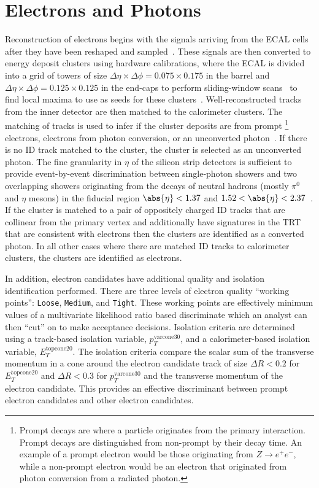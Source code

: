 \section{Electrons and Photons}\label{section:e_gamma}

Reconstruction of electrons begins with the signals arriving from the ECAL cells after they have been reshaped and sampled~\cite{PERF-2013-05}.
These signals are then converted to energy deposit clusters using hardware calibrations, where the ECAL is divided into a grid of towers of size $\Delta \eta \times \Delta \phi = 0.075 \times 0.175$ in the barrel and $\Delta \eta \times \Delta \phi = 0.125 \times 0.125$ in the end-caps to perform sliding-window scans~\cite{Lampl:1099735} to find local maxima to use as seeds for these clusters~\cite{PERF-2013-05}.
Well-reconstructed tracks from the \gls{inner detector} are then matched to the calorimeter clusters.
The matching of tracks is used to infer if the cluster deposits are from prompt%
\footnote{Prompt decays are where a particle originates from the primary interaction.
Prompt decays are distinguished from non-prompt by their decay time.
An example of a prompt electron would be those originating from $Z\to e^{+}e^{-}$, while a non-prompt electron would be an electron that originated from photon conversion from a radiated photon.}
electrons, electrons from photon conversion, or an unconverted photon~\cite{PERF-2013-05,PERF-2016-01}.
If there is no ID track matched to the cluster, the cluster is selected as an unconverted photon.
The fine granularity in $\eta$ of the silicon strip detectors is sufficient to provide event-by-event discrimination between single-photon showers and two overlapping showers originating from the decays of neutral hadrons (mostly $\pi^{0}$ and $\eta$ mesons) in the fiducial region $\abs{\eta} < 1.37$ and $1.52 < \abs{\eta} < 2.37$~\cite{PERF-2017-02}.
If the cluster is matched to a pair of oppositely charged ID tracks that are collinear from the primary vertex and additionally have signatures in the TRT that are consistent with electrons then the clusters are identified as a converted photon.
In all other cases where there are matched ID tracks to calorimeter clusters, the clusters are identified as electrons.

In addition, electron candidates have additional quality and isolation identification performed.
There are three levels of electron quality ``working points'': \texttt{Loose}, \texttt{Medium}, and \texttt{Tight}.
These working points are effectively minimum values of a multivariate likelihood ratio based discriminate which an analyst can then ``cut'' on to make acceptance decisions.
Isolation criteria are determined using a track-based isolation variable, $p_{T}^{\mathrm{varcone30}}$, and a calorimeter-based isolation variable, $E_{T}^{\mathrm{topcone20}}$.
The isolation criteria compare the scalar sum of the transverse momentum in a cone around the electron candidate track of size $\Delta R < 0.2$ for $E_{T}^{\mathrm{topcone20}}$ and $\Delta R < 0.3$ for $p_{T}^{\mathrm{varcone30}}$ and the transverse momentum of the electron candidate.
This provides an effective discriminant between prompt electron candidates and other electron candidates.

